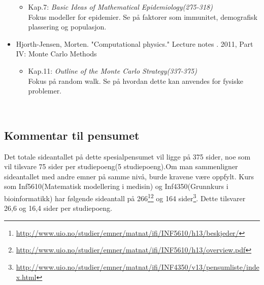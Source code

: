 \documentclass[norsk,11pt.a4paper]{article}
\begin{document}
\begin{itemize}
\begin{itemize}
		\item Kap.7: \emph{Basic Ideas of Mathematical Epidemiology(275-318)}\\
		Fokus modeller for epidemier. Se på faktorer som immunitet, demografisk plassering og populasjon.
	\end{itemize}
	\item Hjorth-Jensen, Morten. "Computational physics." Lecture notes . 2011, Part IV: Monte Carlo Methods
	\begin{itemize}
		\item Kap.11: \emph{Outline of the Monte Carlo Strategy(337-375)}\\
		Fokus på random walk. Se på hvordan dette kan anvendes for fysiske problemer.
	\end{itemize} 
\end{itemize}
\
\subsection*{Kommentar til pensumet}
Det totale sideantallet på dette spesialpensumet vil ligge på 375 sider, noe som vil tilsvare 75 sider per studiepoeng(5 studiepoeng).Om man sammenligner sideantallet med andre emner på samme nivå, burde kravene være oppfylt. Kurs som Inf5610(Matematisk modellering i medisin) og Inf4350(Grunnkurs i bioinformatikk) har følgende sideantall på 266\footnote{\url{http://www.uio.no/studier/emner/matnat/ifi/INF5610/h13/beskjeder/}}\footnote{\url{http://www.uio.no/studier/emner/matnat/ifi/INF5610/h13/overview.pdf}} og 164 sider\footnote{\url{http://www.uio.no/studier/emner/matnat/ifi/INF4350/v13/pensumliste/index.html}}. Dette tilsvarer 26,6 og 16,4 sider per studiepoeng.  
\end{document}
